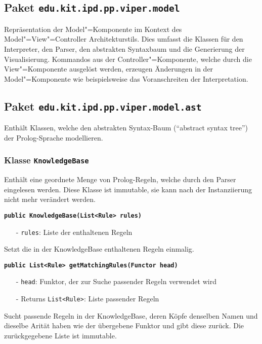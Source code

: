 \documentclass[parskip=full,11pt,twoside]{scrartcl}
\begin{document}
\subsection{Paket \texttt{edu.kit.ipd.pp.viper.model}}

Repräsentation der Model"=Komponente im Kontext des Model"=View"=Controller Architekturstils. Dies umfasst die Klassen für den Interpreter, den Parser, den abstrakten Syntaxbaum und die Generierung der Visualisierung. Kommandos aus der Controller"=Komponente, welche durch die View"=Komponente ausgelöst werden, erzeugen Änderungen in der Model"=Komponente wie beispielsweise das Voranschreiten der Interpretation.

\subsection{Paket \texttt{edu.kit.ipd.pp.viper.model.ast}}

Enthält Klassen, welche den abstrakten Syntax-Baum (\enquote{abstract syntax tree}) der Prolog-Sprache modellieren.
\newpage
\newpage
\subsubsection{Klasse \texttt{KnowledgeBase}}
Enthält eine geordnete Menge von Prolog-Regeln, welche durch den Parser eingelesen werden. Diese Klasse ist immutable, sie kann nach der Instanziierung nicht mehr verändert werden.

\textbf{\texttt{public KnowledgeBase(List<Rule> rules)}}
\begin{itemize}[noitemsep]
	\item[-] \texttt{rules}: Liste der enthaltenen Regeln
\end{itemize}
Setzt die in der KnowledgeBase enthaltenen Regeln einmalig.

\textbf{\texttt{public List<Rule> getMatchingRules(Functor head)}}
\begin{itemize}[noitemsep]
	\item[-] \texttt{head}: Funktor, der zur Suche passender Regeln verwendet wird
	\item[-] Returns \texttt{List<Rule>}: Liste passender Regeln
\end{itemize}
Sucht passende Regeln in der KnowledgeBase, deren Köpfe denselben Namen und dieselbe Arität haben wie der übergebene Funktor und gibt diese zurück. Die zurückgegebene Liste ist immutable.
\end{document}
